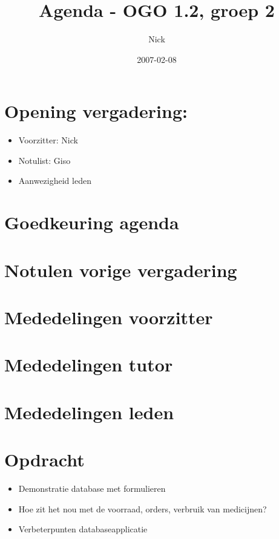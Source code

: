 \documentclass[]{article}
\title{Agenda - OGO 1.2, groep 2}
\author{Nick}
\date{2007-02-08}
\begin{document}
\maketitle


\section{Opening vergadering: }
  \begin{itemize}
    \item Voorzitter: Nick
    \item Notulist: Giso
    \item Aanwezigheid leden
  \end{itemize}

\section{Goedkeuring agenda}

\section{Notulen vorige vergadering}

\section{Mededelingen voorzitter}

\section{Mededelingen tutor}

\section{Mededelingen leden}

\section{Opdracht}

   \begin{itemize}
      \item Demonstratie database met formulieren
      \item Hoe zit het nou met de voorraad, orders, verbruik van
      medicijnen?
      \item Verbeterpunten databaseapplicatie
   \end{itemize}
\end{document}
